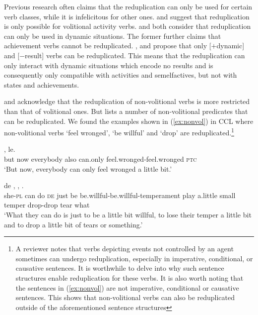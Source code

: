 Previous research often claims that the reduplication can only be used for certain verb classes, while it is infelicitous for other ones.
 \citet[234--235]{LiThompson1981} and \citet[277--278]{Hong1999} suggest that reduplication is only possible for volitional activity verbs.
\citet[70--71]{Dai1997} and \citet[290]{Tsao2001} both consider that reduplication can only be used in dynamic situations.
The former further claims that achievement verbs cannot be reduplicated.
 \citet[155]{XiaoMcEnery2004}, \citet[20]{Arcodiaetal2014} and \citet[145]{BascianoMelloni2017} propose that only [$+$dynamic] and [$-$result] verbs can be reduplicated.
This means that the reduplication can only interact with dynamic situations which encode no results and is consequently only compatible with activities and semelfactives, but not with states and achievements.

\citet[53]{Chen2001} and \citet[10--11]{Yang2003} acknowledge that the reduplication of non\hyp{}vo\-li\-tion\-al verbs is more restricted than that of volitional ones.
But \citet[381--382]{Zhu1998} lists a number of non\hyp{}volitional predicates that can be reduplicated.
We found the examples shown in (\ref{ex:nonvol}) in {CCL} where non\nobreakdash-vo\-li\-tion\-al verbs  `feel wronged',  `be willful' and  `drop' are reduplicated.\footnote{
A reviewer notes that verbs depicting events not controlled 
by an agent sometimes can undergo reduplication, 
especially in imperative, conditional, or causative sentences. 
It is worthwhile to delve into why such sentence structures
enable reduplication for these verbs. 
It is also worth noting that the sentences in (\ref{ex:nonvol}) 
are not imperative, conditional or causative sentences. 
This shows that non-volitional verbs can also be reduplicated
outside of the aforementioned sentence structures
}

\settowidth{}

\begin{sloppypar}
\ea\label{ex:nonvol}
\ea
\gll {} ,     le.\\
but now  everybody also can.only feel.wronged-feel.wronged \textsc{ptc}\\ 
\glt `But now, everybody can only feel wronged a little bit.'

\ex
\gll {}   de   ,    ,   .\\
she-\textsc{pl} can do \textsc{de} just be be.willful-be.willful-temperament play a.little small temper drop-drop tear what \\ 
\glt `What they can do is just to be a little bit willful, to lose their temper a little bit and to drop a little bit of tears or something.'
\z
\z
\end{sloppypar}

